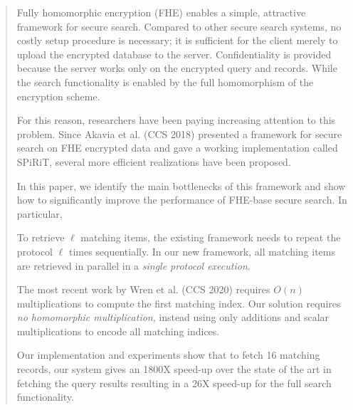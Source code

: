 
\begin{abstract}
Fully homomorphic encryption (FHE) enables a simple, attractive
framework for secure search.  Compared to other secure search systems,
no costly setup procedure is necessary; it is sufficient for the client
merely to upload the encrypted database to the server. Confidentiality
is provided because the server works only on the encrypted query and
records. While the search functionality is enabled by the full
homomorphism of the encryption scheme.

For this reason, researchers have been paying increasing attention to
this problem. Since Akavia et al. (CCS 2018) presented a framework for
secure search on FHE encrypted data and gave a working implementation
called SPiRiT, several more efficient realizations have been proposed. 

In this paper, we identify the main bottlenecks of this framework and
show how to significantly improve the performance of FHE-base secure
search. In particular,  
\BI
\item To retrieve $\ell$ matching items, the existing framework needs to
repeat the protocol $\ell$ times sequentially. In our new framework, all
matching items are retrieved in parallel in a {\em single protocol
execution}.

\item The most recent work by Wren et al. (CCS 2020) requires $O(n)$
multiplications to compute the first matching index. Our solution
requires {\em no homomorphic multiplication}, instead using only
additions and scalar multiplications to encode all matching indices.  

\item 
  Our implementation and experiments show that to fetch 16 matching
  records, our system gives an 1800X speed-up over the state of the art
  in fetching the query results resulting in a 26X speed-up for the full
  search functionality.
  
  
\EI


\end{abstract}
